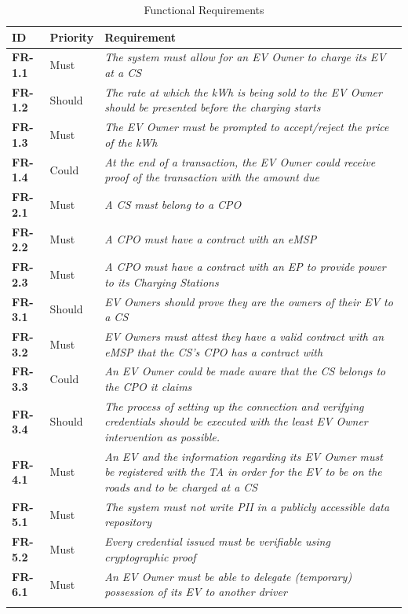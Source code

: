 \begin{longtable}{|p{}p{}p{}|}
    \hline
    \textbf{ID} & \textbf{Priority} & \textbf{Requirement}\\
    \hline
    \hline
   \textbf{FR-1.1} & Must & \textit{The system must allow for an EV Owner to charge its EV at a CS}\\
   \textbf{FR-1.2} & Should & \textit{The rate at which the kWh is being sold to the EV Owner should be presented before the charging starts}\\
   \textbf{FR-1.3} & Must & \textit{The EV Owner must be prompted to accept/reject the price of the kWh}\\
   \textbf{FR-1.4} & Could & \textit{At the end of a transaction, the EV Owner could receive proof of the transaction with the amount due}\\
   \hline
   \textbf{FR-2.1} & Must & \textit{A CS must belong to a CPO}\\
   \textbf{FR-2.2} & Must & \textit{A CPO must have a contract with an eMSP}\\
   \textbf{FR-2.3} & Must & \textit{A CPO must have a contract with an EP to provide power to its Charging Stations}\\
   \hline
   \textbf{FR-3.1} & Should & \textit{EV Owners should prove they are the owners of their EV to a CS}\\
   \textbf{FR-3.2} & Must & \textit{EV Owners must attest they have a valid contract with an eMSP that the CS's CPO has a contract with}\\
   \textbf{FR-3.3} & Could & \textit{An EV Owner could be made aware that the CS belongs to the CPO it claims} \\
   \textbf{FR-3.4} & Should & \textit{The process of setting up the connection and verifying credentials should be executed with the least EV Owner intervention as possible.}\\
   \hline
   \textbf{FR-4.1} & Must & \textit{An EV and the information regarding its EV Owner must be registered with the TA in order for the EV to be on the roads and to be charged at a CS}\\
   \hline
   \textbf{FR-5.1} & Must & \textit{The system must not write \acrfull{PII} in a publicly accessible data repository}\\
   \textbf{FR-5.2} & Must & \textit{Every credential issued must be verifiable using cryptographic proof}\\
   \hline
   \textbf{FR-6.1} & Must & \textit{An EV Owner must be able to delegate (temporary) possession of its EV to another driver}\\
   \hline
    \caption{Functional Requirements}
    \label{tab:functional_requirements}
\end{longtable}
    
